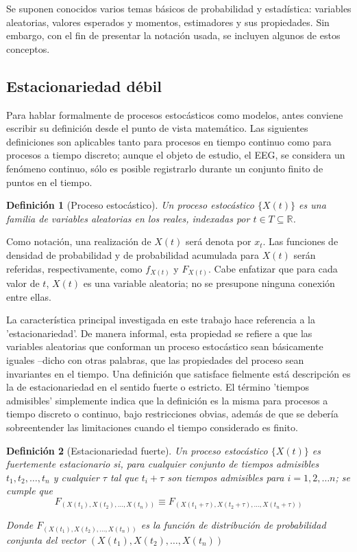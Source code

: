 \documentclass[12pt,a4paper]{mitthesis}
\newtheorem{defn}{Definici\'on}
\newcommand{\R}{\mathbb{R}}
\begin{document}
Se suponen conocidos varios temas b\'asicos de probabilidad y estad\'istica: variables aleatorias, 
valores esperados y momentos, estimadores y sus propiedades.
Sin embargo, con el fin de presentar la notaci\'on usada, se incluyen algunos de estos conceptos.

\subsection{Estacionariedad d\'ebil}

Para hablar formalmente de procesos estoc\'asticos como modelos, antes conviene escribir su 
definici\'on desde el punto de vista matem\'atico. Las siguientes definiciones son aplicables tanto 
para procesos en tiempo continuo como para procesos a tiempo discreto; aunque el objeto de estudio, 
el EEG, se considera un fen\'omeno continuo, s\'olo es posible registrarlo durante un conjunto 
finito de puntos en el tiempo.

\begin{defn}[Proceso estoc\'astico]
Un proceso estoc\'astico $\{ X(t) \}$ es una familia de variables aleatorias en los reales, 
indexadas por $t \in T \subseteq \R$.
\end{defn}

Como notaci\'on, una realizaci\'on de $X(t)$ ser\'a denota por $x_t$. Las funciones de densidad de 
probabilidad y de probabilidad acumulada para $X(t)$ ser\'an referidas, respectivamente, como 
$f_{X(t)}$ y $F_{X(t)}$. Cabe enfatizar que para cada valor de $t$, $X(t)$ es una variable 
aleatoria; no se presupone ninguna conexi\'on entre ellas.

La caracter\'istica principal investigada en este trabajo hace referencia a la 'estacionariedad'. 
De manera informal, esta propiedad se refiere a que las variables aleatorias que conforman un 
proceso estoc\'astico sean b\'asicamente iguales --dicho con otras palabras, que las propiedades
del proceso sean invariantes en el tiempo. 
Una definici\'on que satisface fielmente est\'a descripci\'on es la de estacionariedad en el 
sentido fuerte o estricto.
El t\'ermino 'tiempos admisibles' simplemente indica que la definici\'on es la misma para
procesos a tiempo discreto o continuo, bajo restricciones obvias, adem\'as de que se deber\'ia
sobreentender las limitaciones cuando el tiempo considerado es finito.

\begin{defn}[Estacionariedad fuerte]
Un proceso estoc\'astico $\{ X(t) \}$ es fuertemente estacionario si, para cualquier conjunto de 
tiempos admisibles $t_1,t_2,\dots,t_n$ y cualquier $\tau$ tal que $t_i+\tau$ son tiempos admisibles 
para $i = 1, 2, \dots n$; se cumple que
\begin{equation*}
F_{\left(X(t_1),X(t_2),\dots,X(t_n)\right) }
\equiv
F_{\left(X(t_1+\tau),X(t_2+\tau),\dots,X(t_n+\tau)\right)}
\end{equation*}

Donde $F_{\left(X(t_1),X(t_2),\dots,X(t_n)\right) }$ es la funci\'on de distribuci\'on de 
probabilidad conjunta del vector $\left(X(t_1),X(t_2),\dots,X(t_n)\right)$
\end{defn}
\end{document}
